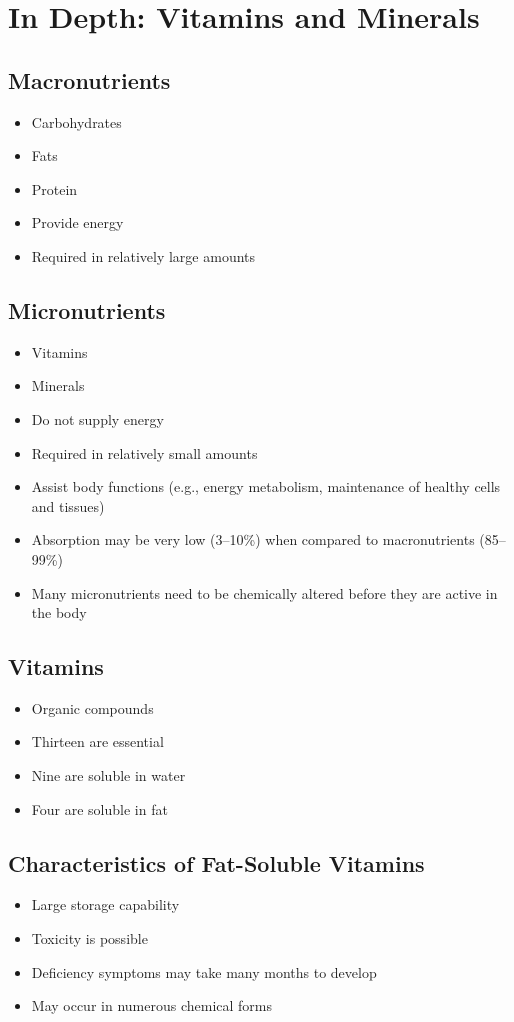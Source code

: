 \documentclass[title={Chapter 6}]{fdsn201notes}
\begin{document}
\section{In Depth: Vitamins and Minerals}\label{sec:in-depth:-vitamins-and-minerals}
\subsection{Macronutrients}\label{subsec:macronutrients}
\begin{itemize}
	\item Carbohydrates
	\item Fats
	\item Protein
	\item Provide energy
	\item Required in relatively large amounts
\end{itemize}

\subsection{Micronutrients}\label{subsec:micronutrients}
\begin{itemize}
	\item Vitamins
	\item Minerals
	\item Do not supply energy
	\item Required in relatively small amounts
	\item Assist body functions (e.g., energy metabolism, maintenance of healthy cells and tissues)
	\item Absorption may be very low (3--10\%) when compared to macronutrients (85--99\%)
	\item Many micronutrients need to be chemically altered before they are active in the body
\end{itemize}

\subsection{Vitamins}\label{subsec:vitamins}
\begin{itemize}
	\item Organic compounds
	\item Thirteen are essential
	\item Nine are soluble in water
	\item Four are soluble in fat
\end{itemize}

\subsection{Characteristics of Fat-Soluble Vitamins}\label{subsec:characteristics-of-fat-soluble-vitamins}
\begin{itemize}
	\item Large storage capability
	\item Toxicity is possible
	\item Deficiency symptoms may take many months to develop
	\item May occur in numerous chemical forms
\end{itemize}
\end{document}
